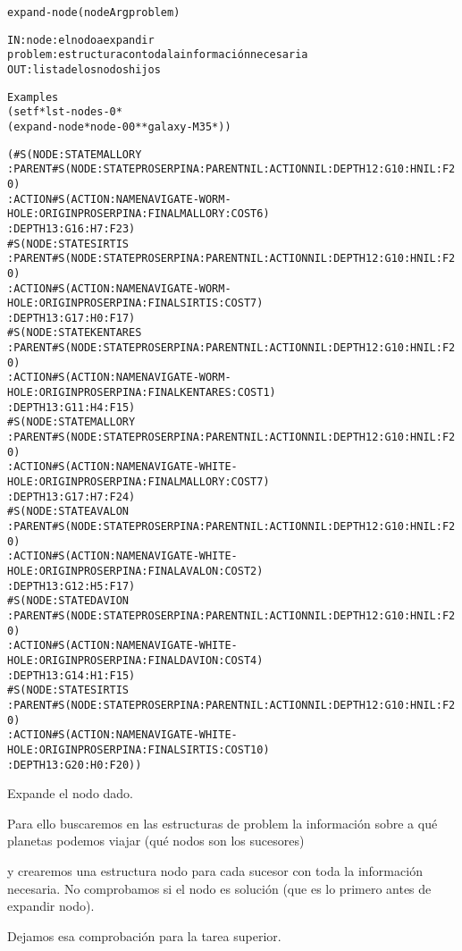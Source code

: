 \begin{aibox}{\function}
\begin{alltt}
expand-node (nodeArg problem)


IN:     node: el nodo a expandir
       problem: estructura con toda la información necesaria
OUT: lista de los nodos hijos

\end{alltt}
\end{aibox}

\begin{aibox}{\examples}
\begin{alltt}
Examples
(setf *lst-nodes-0*
    (expand-node *node-00* *galaxy-M35*))

(\#S(NODE :STATE MALLORY
 :PARENT  \#S(NODE :STATE PROSERPINA :PARENT NIL :ACTION NIL :DEPTH 12 :G 10 :H NIL :F 20)
 :ACTION  \#S(ACTION :NAME NAVIGATE-WORM-HOLE :ORIGIN PROSERPINA :FINAL MALLORY :COST 6)
 :DEPTH 13 :G 16 :H 7 :F 23)
\#S(NODE :STATE SIRTIS
 :PARENT  \#S(NODE :STATE PROSERPINA :PARENT NIL :ACTION NIL :DEPTH 12 :G 10 :H NIL :F 20)
 :ACTION  \#S(ACTION :NAME NAVIGATE-WORM-HOLE :ORIGIN PROSERPINA :FINAL SIRTIS :COST 7)
 :DEPTH 13 :G 17 :H 0 :F 17)
\#S(NODE :STATE KENTARES
 :PARENT  \#S(NODE :STATE PROSERPINA :PARENT NIL :ACTION NIL :DEPTH 12 :G 10 :H NIL :F 20)
 :ACTION  \#S(ACTION :NAME NAVIGATE-WORM-HOLE :ORIGIN PROSERPINA :FINAL KENTARES :COST 1)
 :DEPTH 13 :G 11 :H 4 :F 15)
\#S(NODE :STATE MALLORY
 :PARENT  \#S(NODE :STATE PROSERPINA :PARENT NIL :ACTION NIL :DEPTH 12 :G 10 :H NIL :F 20)
 :ACTION  \#S(ACTION :NAME NAVIGATE-WHITE-HOLE :ORIGIN PROSERPINA :FINAL MALLORY :COST 7)
 :DEPTH 13 :G 17 :H 7 :F 24)
\#S(NODE :STATE AVALON
 :PARENT  \#S(NODE :STATE PROSERPINA :PARENT NIL :ACTION NIL :DEPTH 12 :G 10 :H NIL :F 20)
 :ACTION  \#S(ACTION :NAME NAVIGATE-WHITE-HOLE :ORIGIN PROSERPINA :FINAL AVALON :COST 2)
 :DEPTH 13 :G 12 :H 5 :F 17)
\#S(NODE :STATE DAVION
 :PARENT  \#S(NODE :STATE PROSERPINA :PARENT NIL :ACTION NIL :DEPTH 12 :G 10 :H NIL :F 20)
 :ACTION  \#S(ACTION :NAME NAVIGATE-WHITE-HOLE :ORIGIN PROSERPINA :FINAL DAVION :COST 4)
 :DEPTH 13 :G 14 :H 1 :F 15)
\#S(NODE :STATE SIRTIS
 :PARENT  \#S(NODE :STATE PROSERPINA :PARENT NIL :ACTION NIL :DEPTH 12 :G 10 :H NIL :F 20)
 :ACTION  \#S(ACTION :NAME NAVIGATE-WHITE-HOLE :ORIGIN PROSERPINA :FINAL SIRTIS :COST 10)
 :DEPTH 13 :G 20 :H 0 :F 20))



\end{alltt}
\end{aibox}

\begin{aibox}{\comments}
Expande el nodo dado.

Para ello buscaremos en las estructuras de problem 
la información sobre a qué planetas podemos viajar (qué nodos son los sucesores)

y crearemos una estructura nodo para cada sucesor con toda la información necesaria.  No comprobamos si el nodo es solución (que es lo primero antes de expandir nodo).

Dejamos esa comprobación para la tarea superior.

\end{aibox}


